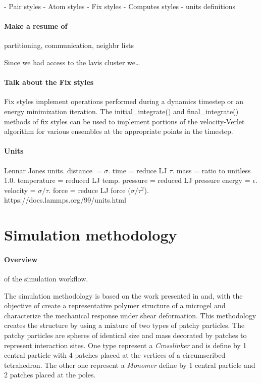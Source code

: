 - Pair styles
- Atom styles
- Fix styles
- Computes styles
- units definitions

\paragraph{Make a resume of } partitioning, communication, neighbr lists

Since we had access to the lavis cluster we\dots

\paragraph{Talk about the Fix styles} Fix styles implement operations performed during a dynamics timestep or an energy minimization iteration\citep{thompsonLAMMPSFlexibleSimulation2022}.
The initial\_integrate() and final\_integrate() methods of fix styles can be used to implement portions of the velocity-Verlet algorithm for various ensembles at the appropriate points in the timestep.

\paragraph{Units} Lennar Jones units.
distance $=\sigma$.
time = reduce LJ $\tau$.
mass = ratio to unitless $1.0$.
temperature = reduced LJ temp.
pressure = reduced LJ pressure
energy = $\epsilon$.
velocity = $\sigma/\tau$.
force = reduce LJ force ($\sigma/\tau^2$).
https://docs.lammps.org/99/units.html

\section{Simulation methodology}\label{ch3:SimProtocol}

\paragraph{Overview} of the simulation workflow.

The simulation methodology is based on the work presented in\citep{gnanSilicoSynthesisMicrogel2017} and\citep{sorichettiStructureElasticityModel2023}, with the objective of create a representative polymer structure of a microgel and characterize the mechanical response under shear deformation.
This methodology creates the structure by using a mixture of two types of patchy particles.
The patchy particles are spheres of identical size and mass decorated by patches to represent interaction sites.
One type represent a \textit{Crosslinker} and is define by 1 central particle with 4 patches placed at the vertices of a circumscribed tetrahedron. %
The other one represent a \textit{Monomer} define by 1 central particle and 2 patches placed at the poles.

